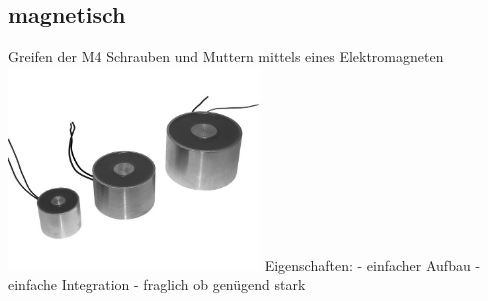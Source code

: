 \subsection{magnetisch}
Greifen der M4 Schrauben und Muttern mittels eines Elektromagneten
\includegraphics[width=0.5\textwidth]{Images/Magnetgreifer.png}
Eigenschaften:
- einfacher Aufbau
- einfache Integration
- fraglich ob genügend stark
